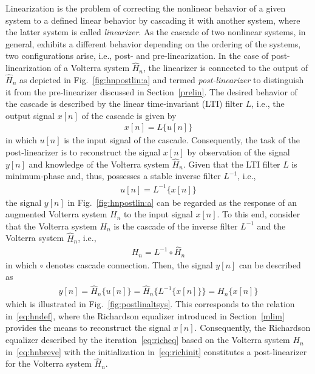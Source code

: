 \documentclass[10pt,twocolumn,twoside]{IEEEtran}
\begin{document}
Linearization is the problem of correcting the nonlinear behavior of a
given system to a defined linear behavior by cascading it with another
system, where the latter system is called
\emph{linearizer}. As the cascade of two nonlinear systems,
in general, exhibits a different behavior depending on the ordering of the
systems, two configurations arise, i.e., post- and pre-linearization.
In the case of post-linearization of a Volterra system $\hat{H}_n$, the
linearizer is connected to the output of $\hat{H}_n$ as depicted in
Fig.~\ref{fig:hnpostlin:a} and termed \emph{post-linearizer}
to distinguish it from the pre-linearizer discussed in Section~\ref{prelin}.
The desired behavior of the cascade is described by the linear time-invariant
(LTI) filter $L$, i.e., the output signal $x[n]$ of the cascade is given by
\begin{align}
	x[n]=L\{u[n]\}
	\label{eq:xludef}
\end{align}
in which $u[n]$ is the input signal of the cascade. Consequently, the task of the
post-linearizer is to reconstruct the signal $x[n]$ by observation of the signal $y[n]$ and
knowledge of the Volterra system $\hat{H}_n$. Given that the LTI filter $L$ is
minimum-phase and, thus, possesses a stable inverse filter $L^{-1}$, i.e.,
\begin{align}
	u[n] = L^{-1}\{x[n]\}
	\label{eq:linvdef}
\end{align}
the signal $y[n]$ in Fig.~\ref{fig:hnpostlin:a} can be regarded as the response
of an augmented Volterra system $H_n$ to the input signal $x[n]$.
To this end, consider that the Volterra system $H_n$ is the cascade of the
inverse filter $L^{-1}$ and the Volterra system $\hat{H}_n$, i.e.,
\begin{align}
	H_n = L^{-1} \circ \hat{H}_n
	\label{eq:hnbreve}
\end{align}
in which $\circ$ denotes cascade connection. Then, the signal $y[n]$
can be described as
\begin{align*}
	y[n] = \hat{H}_n\{u[n]\}
	     = \hat{H}_n\{L^{-1}\{x[n]\}\}
	     = H_n\{x[n]\}
\end{align*}
which is illustrated in Fig.~\ref{fig:postlinaltsys}.
This corresponds to the relation in~\eqref{eq:hndef},
where the Richardson equalizer introduced in Section~\ref{mlim} provides
the means to reconstruct the signal $x[n]$. Consequently, the Richardson
equalizer described by the iteration~\eqref{eq:richeq} based on the Volterra
system $H_n$ in~\eqref{eq:hnbreve} with the initialization in~\eqref{eq:richinit}
constitutes a post-linearizer for the Volterra system $\hat{H}_n$.
\end{document}

